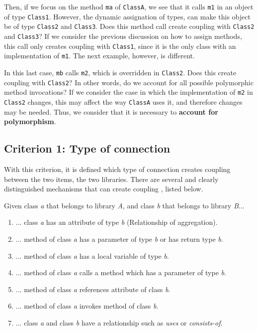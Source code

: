 \documentclass[a4paper]{article}
\begin{document}
Then, if we focus on the method \texttt{ma} of \texttt{ClassA}, we see that it calls \texttt{m1} in an object of type \texttt{Class1}. However, the dynamic assignation of types, can make this object be of type \texttt{Class2} and \texttt{Class3}. Does this method call create coupling with \texttt{Class2} and \texttt{Class3}? If we consider the previous discussion on how to assign methods, this call only creates coupling with \texttt{Class1}, since it is the only class with an implementation of \texttt{m1}. The next example, however, is different.

In this last case, \texttt{mb} calls \texttt{m2}, which is overridden in \texttt{Class2}. Does this create coupling with \texttt{Class2}? In other words, do we account for all possible polymorphic method invocations? If we consider the case in which the implementation of \texttt{m2} in \texttt{Class2} changes, this may affect the way \texttt{ClassA} uses it, and therefore changes may be needed. Thus, we consider that it is necessary to \textbf{account for polymorphism}.

\subsection{Criterion 1: Type of connection}
With this criterion, it is defined which type of connection creates coupling between the two items, the two libraries. There are several and clearly distinguished mechanisms that can create coupling \cite{briand1999unified}, listed below.

Given class \textit{a} that belongs to library \textit{A}, and class \textit{b} that belongs to library \textit{B}...

\begin{enumerate}[noitemsep,leftmargin=*]
  \item ... class \textit{a} has an attribute of type \textit{b} (Relationship of aggregation).
  \item ... method of class \textit{a} has a parameter of type \textit{b} or has return type \textit{b}.
  \item ... method of class \textit{a} has a local variable of type \textit{b}.
  \item ... method of class \textit{a} calls a method which has a parameter of type \textit{b}.
  \item ... method of class \textit{a} references attribute of class \textit{b}.
  \item ... method of class \textit{a} invokes method of class \textit{b}.
  \item ... class \textit{a} and class \textit{b} have a relationship such as \textit{uses} or \textit{consists-of}.
\end{enumerate}
\end{document}
